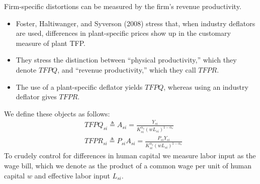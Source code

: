\documentclass{article}
\begin{document}
Firm-specific distortions can be measured by the firm’s revenue productivity. 
\begin{itemize}
    \item Foster, Haltiwanger, and Syverson (2008) stress that, when industry deflators are used, differences in plant-specific prices show up in the customary measure of plant TFP.
    \item They stress the distinction between “physical productivity,” which they denote $TFPQ$, and “revenue productivity,” which they call $TFPR$.
    \item The use of a plant-specific deflator yields $TFPQ$, whereas using an industry deflator gives $TFPR$.
\end{itemize}
We define these objects as follows:
\begin{align*}
    &TFPQ_{si} \triangleq A_{si} = \frac{Y_{si}}{K_{si}^{\alpha_s}(wL_{si})^{1-\alpha_s}}\\
    &TFPR_{si} \triangleq P_{si}A_{si} = \frac{P_{si}Y_{si}}{K_{si}^{\alpha_s}(wL_{si})^{1-\alpha_s}}
\end{align*}
To crudely control for differences in human capital we measure labor input as the wage bill, which we denote as the product of a common wage per unit of human capital $w$ and effective labor input $L_{si}$.
\end{document}
